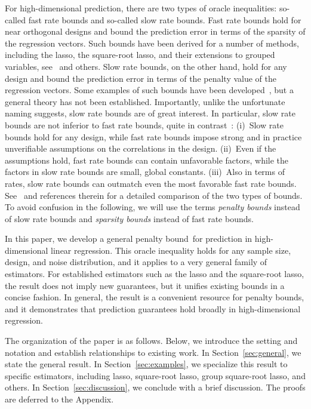 \documentclass[bj]{imsart}
\newcommand{\1}{{\rm 1}\mskip -4,5mu{\rm l} }
\begin{document}
\newcommand{\sbo}{sparsity bound}
\newcommand{\pbo}{penalty bound}
\newcommand{\Pbo}{Penalty bound}
\newcommand{\sbos}{sparsity bounds}
\newcommand{\Sbos}{Sparsity bounds}
\newcommand{\pbos}{penalty bounds}

For high-dimensional prediction, there are two types of oracle inequalities:  so-called fast rate bounds and so-called slow rate bounds. Fast rate bounds hold for near orthogonal designs and bound the prediction error in terms of the sparsity of the regression vectors. Such bounds have been derived for a number of methods, including the lasso, the square-root lasso, and their extensions to grouped variables, see~\cite{Belloni11,Buhlmann11,Bunea_Tsybakov_Wegkamp07,Hastie15,Yoyo13,vdGeer11} and others. Slow rate bounds, on the other hand, hold for any design and bound the prediction error in terms of the penalty value of the regression vectors. Some examples of such bounds have been developed~\cite{MM11,Kolt10,RigTsy11}, but a general theory has not been established. Importantly, unlike the unfortunate naming suggests, slow rate bounds are of great interest. In particular, slow rate bounds are not inferior to fast rate bounds,  quite in contrast~\cite{ArnakMoYo14,Hebiri13}:  (i)~Slow rate bounds hold for any design, while fast rate bounds impose strong and in practice unverifiable assumptions on the correlations in the design. (ii)~Even if the assumptions hold,  fast rate bounds can contain unfavorable factors, while the factors in slow rate bounds are small, global constants. (iii)~Also in terms of rates, slow rate bounds can outmatch even the most favorable fast rate bounds. See~\cite{ArnakMoYo14} and references therein for a detailed comparison of the two types of bounds. To avoid confusion in the following, we will use the terms \emph{\pbos}  instead of slow rate bounds  and \emph{\sbos} instead of fast rate bounds.

In this paper, we develop a general \pbo\ for prediction in high-dimensional linear regression. 
This oracle inequality holds for any sample size, design, and noise distribution, and it applies to a very general family of estimators.
For established estimators such as the lasso and the square-root lasso, the result does not imply new guarantees, but it unifies existing bounds in a concise fashion.
In general, the result is a convenient resource for \pbos, and it demonstrates that prediction guarantees hold broadly in high-dimensional regression.

The organization of the paper is as follows. Below, we introduce the setting and notation and establish relationships to existing work. In Section~\ref{sec:general}, we state the general result. In Section~\ref{sec:examples}, we specialize this result to specific estimators, including lasso, square-root lasso, group square-root lasso, and others. In Section~\ref{sec:discussion}, we conclude with a brief discussion. The proofs are deferred to the Appendix.
\end{document}
